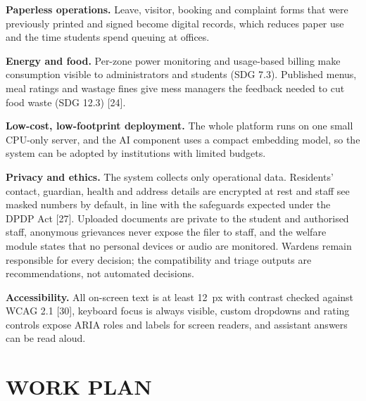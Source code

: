 \documentclass[12pt,a4paper,oneside]{report}
\begin{document}
\textbf{Paperless operations.} Leave, visitor, booking and complaint forms that were previously printed and signed
become digital records, which reduces paper use and the time students spend queuing at offices.

\textbf{Energy and food.} Per-zone power monitoring and usage-based billing make consumption visible to administrators
and students (SDG 7.3). Published menus, meal ratings and wastage fines give mess managers the feedback needed to cut
food waste (SDG 12.3) [24].

\textbf{Low-cost, low-footprint deployment.} The whole platform runs on one small CPU-only server, and the AI component
uses a compact embedding model, so the system can be adopted by institutions with limited budgets.

\textbf{Privacy and ethics.} The system collects only operational data. Residents' contact, guardian, health and address details are
encrypted at rest and staff see masked numbers by default, in line with the safeguards expected under the DPDP Act
[27]. Uploaded documents are private to the student and authorised staff, anonymous grievances never expose the filer to staff, and the welfare module states that no
personal devices or audio are monitored. Wardens remain responsible for every decision; the compatibility and triage
outputs are recommendations, not automated decisions.

\textbf{Accessibility.} All on-screen text is at least 12~px with contrast checked against WCAG 2.1 [30], keyboard
focus is always visible, custom dropdowns and rating controls expose ARIA roles and labels for screen readers, and
assistant answers can be read aloud.

\chapter{WORK PLAN}
\end{document}
